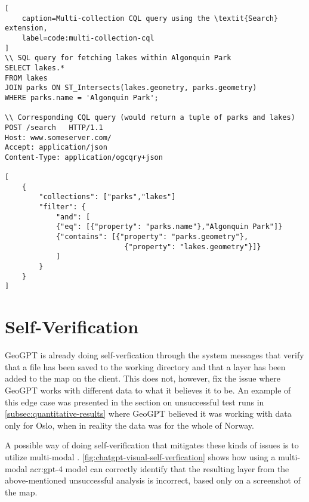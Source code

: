 \begin{lstlisting}[
    caption=Multi-collection CQL query using the \textit{Search} extension,
    label=code:multi-collection-cql
]
\\ SQL query for fetching lakes within Algonquin Park
SELECT lakes.*
FROM lakes
JOIN parks ON ST_Intersects(lakes.geometry, parks.geometry)
WHERE parks.name = 'Algonquin Park';

\\ Corresponding CQL query (would return a tuple of parks and lakes)
POST /search   HTTP/1.1                                           
Host: www.someserver.com/                                         
Accept: application/json                                          
Content-Type: application/ogcqry+json                             
                                                                    
[                                                                 
    {                                                              
        "collections": ["parks","lakes"]                            
        "filter": {                                                 
            "and": [                                                 
            {"eq": [{"property": "parks.name"},"Algonquin Park"]} 
            {"contains": [{"property": "parks.geometry"},         
                            {"property": "lakes.geometry"}]}        
            ]                                                        
        }                                                           
    }                                                              
]
\end{lstlisting}


\section{Self-Verification}

GeoGPT is already doing self-verfication through the system messages that verify that a file has been saved to the working directory and that a layer has been added to the map on the client. This does not, however, fix the issue where GeoGPT works with different data to what it believes it to be. An example of this edge case was presented in the section on unsuccessful test runs in \autoref{subsec:quantitative-results} where GeoGPT believed it was working with data only for Oslo, when in reality the data was for the whole of Norway.

A possible way of doing self-verification that mitigates these kinds of issues is to utilize multi-modal . \autoref{fig:chatgpt-visual-self-verfication} shows how using a multi-modal \acrshort{acr:gpt}-4 model can correctly identify that the resulting layer from the above-mentioned unsuccessful analysis is incorrect, based only on a screenshot of the map.


